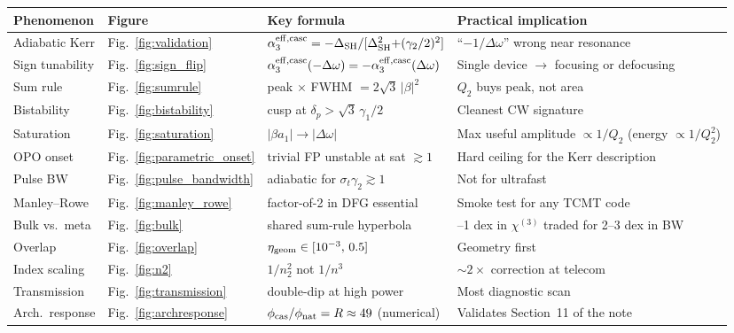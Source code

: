 \documentclass[11pt,a4paper]{article}
\newcommand{\chithree}{\chi^{(3)}}
\newcommand{\Dom}{\Delta\omega}
\newcommand{\DSH}{\Delta_{\rm SH}}
\newcommand{\effc}{{\rm eff,casc}}
\newcommand{\geom}{{\rm geom}}
\begin{document}
\begin{table}[H]
\centering
\renewcommand{\arraystretch}{1.20}
\setlength{\tabcolsep}{3pt}
\footnotesize
\begin{tabular}{>{\raggedright\arraybackslash}p{}
                >{\raggedright\arraybackslash}p{}
                >{\raggedright\arraybackslash}p{}
                >{\raggedright\arraybackslash}p{}}
\toprule
Phenomenon & Figure & Key formula & Practical implication \\
\midrule
Adiabatic Kerr & Fig.~\ref{fig:validation} &
$\alpha_3^{\effc} = -\DSH/[\DSH^{2}{+}(\gamma_2/2)^{2}]$ &
``$-1/\Dom$'' wrong near resonance \\
Sign tunability & Fig.~\ref{fig:sign_flip} &
$\alpha_3^{\effc}(-\Dom) = -\alpha_3^{\effc}(\Dom)$ &
Single device $\to$ focusing or defocusing \\
Sum rule & Fig.~\ref{fig:sumrule} &
peak $\times$ FWHM $= 2\sqrt{3}\,|\beta|^{2}$ &
$Q_2$ buys peak, not area \\
Bistability & Fig.~\ref{fig:bistability} &
cusp at $\delta_p > \sqrt{3}\, \gamma_1/2$ &
Cleanest CW signature \\
Saturation & Fig.~\ref{fig:saturation} &
$|\beta a_1| \to |\Dom|$ &
Max useful amplitude $\propto 1/Q_2$ (energy $\propto 1/Q_2^{2}$) \\
OPO onset & Fig.~\ref{fig:parametric_onset} &
trivial FP unstable at sat $\gtrsim 1$ &
Hard ceiling for the Kerr description \\
Pulse BW & Fig.~\ref{fig:pulse_bandwidth} &
adiabatic for $\sigma_t \gamma_2 \gtrsim 1$ &
Not for ultrafast \\
Manley--Rowe & Fig.~\ref{fig:manley_rowe} &
factor-of-2 in DFG essential &
Smoke test for any TCMT code \\
Bulk vs.~meta & Fig.~\ref{fig:bulk} &
shared sum-rule hyperbola &
0.5--1 dex in $\chithree$ traded for 2--3 dex in BW \\
Overlap & Fig.~\ref{fig:overlap} &
$\eta_\geom \in [10^{-3},\, 0.5]$ &
Geometry first \\
Index scaling & Fig.~\ref{fig:n2} &
$1/n_2^{2}$ not $1/n^{3}$ &
$\sim 2\times$ correction at telecom \\
Transmission & Fig.~\ref{fig:transmission} &
double-dip at high power &
Most diagnostic scan \\
\midrule
Arch.\ response & Fig.~\ref{fig:archresponse} &
$\phi_{\rm cas}/\phi_{\rm nat} = R \approx 49$ (numerical) &
Validates Section~11 of the note \\

\end{tabular}
\end{table}
\end{document}
